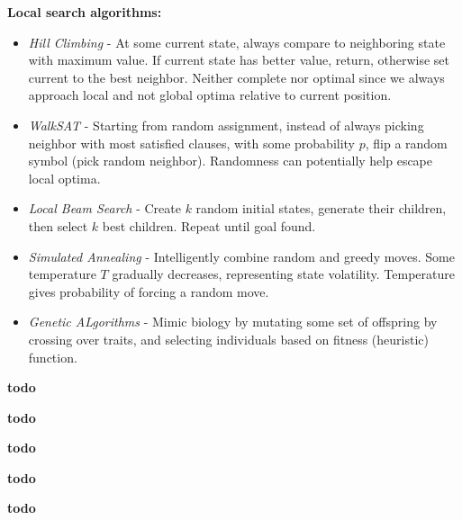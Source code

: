 \documentclass[a4paper,10pt,twocolumn]{article}
\begin{document}
\begin{tcolorbox}[title=Heuristic Search, module]
    \textbf{Local search algorithms:}
    \begin{itemize}
        \item \textit{Hill Climbing} - At some current state, always compare to neighboring state with maximum value. If current state has better value, return, otherwise set current to the best neighbor. Neither complete nor optimal since we always approach local and not global optima relative to current position.
        \item \textit{WalkSAT} - Starting from random assignment, instead of always picking neighbor with most satisfied clauses, with some probability $p$, flip a random symbol (pick random neighbor). Randomness can potentially help escape local optima.
        \item \textit{Local Beam Search} - Create $k$ random initial states, generate their children, then select $k$ best children. Repeat until goal found.
        \item \textit{Simulated Annealing} - Intelligently combine random and greedy moves. Some temperature $T$ gradually decreases, representing state volatility. Temperature gives probability of forcing a random move.
        \item \textit{Genetic ALgorithms} - Mimic biology by mutating some set of offspring by crossing over traits, and selecting individuals based on fitness (heuristic) function.
    \end{itemize}

\end{tcolorbox}

\begin{tcolorbox}[title=Game Search, module]
    \textbf{todo}
\end{tcolorbox}

\begin{tcolorbox}[title=Constraint Satisfaction, module]
    \textbf{todo}
\end{tcolorbox}

\begin{tcolorbox}[title=Logic, module]
    \textbf{todo}
\end{tcolorbox}

\begin{tcolorbox}[title={Probability \& Uncertainty, Bayesian Networks}, module]
    \textbf{todo}
\end{tcolorbox}

\begin{tcolorbox}[title={Intro to ML, Linear Regression, kNN}, module]
    \textbf{todo}
\end{tcolorbox}
\end{document}
